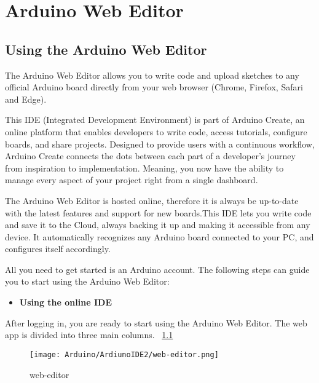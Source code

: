 %
%


\chapter{Arduino Web Editor}


\section{Using the Arduino Web Editor}


The Arduino Web Editor allows you to write code and upload sketches to any official Arduino board directly from your web browser (Chrome, Firefox, Safari and Edge).

This IDE (Integrated Development Environment) is part of Arduino Create, an online platform that enables developers to write code, access tutorials, configure boards, and share projects. Designed to provide users with a continuous workflow, Arduino Create connects the dots between each part of a developer's journey from inspiration to implementation. Meaning, you now have the ability to manage every aspect of your project right from a single dashboard.

The Arduino Web Editor is hosted online, therefore it is always be up-to-date with the latest features and support for new boards.This IDE lets you write code and save it to the Cloud, always backing it up and making it accessible from any device. It automatically recognizes any Arduino board connected to your PC, and configures itself accordingly.

All you need to get started is an Arduino account. The following steps can guide you to start using the Arduino Web Editor: \cite{arduinoWebEditor:2024}

\begin{itemize}
    \item \textbf{Using the online IDE}
\end{itemize}

After logging in, you are ready to start using the Arduino Web Editor. The web app is divided into three main columns. ~\ref{web-editor}

\begin{figure}
    \begin{center}
        \texttt{[image: Arduino/ArdiunoIDE2/web-editor.png]}
        \caption{web-editor}
        \label{web-editor}
    \end{center}
\end{figure}

